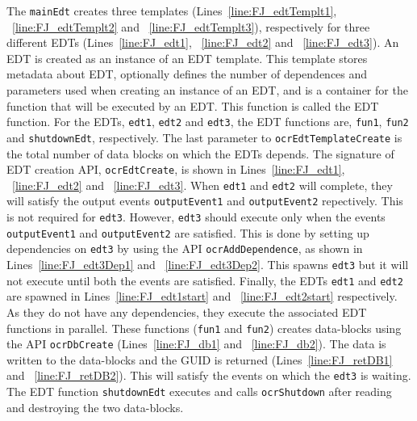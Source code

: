 The \texttt{mainEdt} creates three templates (Lines~\ref{line:FJ_edtTemplt1}, ~\ref{line:FJ_edtTemplt2}
and ~\ref{line:FJ_edtTemplt3}), respectively for three different EDTs
(Lines~\ref{line:FJ_edt1}, ~\ref{line:FJ_edt2} and ~\ref{line:FJ_edt3}).
An EDT is created as an instance of an EDT template.
This template stores metadata about EDT,
optionally defines the number of dependences and parameters used when
creating an instance of an EDT, and is a container for the function
that will be executed by an EDT. This function is called the EDT function.
For the EDTs, \texttt{edt1}, \texttt{edt2} and \texttt{edt3}, the EDT functions
are, \texttt{fun1}, \texttt{fun2} and \texttt{shutdownEdt}, respectively.
The last parameter to \texttt{ocrEdtTemplateCreate} is the total number of
data blocks on which the EDTs depends. The signature of EDT creation API,
\texttt{ocrEdtCreate}, is shown in Lines~\ref{line:FJ_edt1}, ~\ref{line:FJ_edt2}
and ~\ref{line:FJ_edt3}. When \texttt{edt1} and \texttt{edt2} will complete,
they will satisfy the output events \texttt{outputEvent1} and \texttt{outputEvent2} repectively.
This is not required for \texttt{edt3}. However, \texttt{edt3} should execute only
when the events \texttt{outputEvent1} and \texttt{outputEvent2} are satisfied.
This is done by setting up dependencies on \texttt{edt3} by using the API \texttt{ocrAddDependence},
as shown in Lines~\ref{line:FJ_edt3Dep1} and ~\ref{line:FJ_edt3Dep2}.
This spawns \texttt{edt3} but it will not execute until both the events
are satisfied. Finally, the EDTs \texttt{edt1} and \texttt{edt2} are
spawned in Lines~\ref{line:FJ_edt1start} and ~\ref{line:FJ_edt2start} respectively.
As they do not have any dependencies, they execute the associated EDT functions
in parallel. These functions (\texttt{fun1} and \texttt{fun2}) creates
data-blocks using the API \texttt{ocrDbCreate} (Lines~\ref{line:FJ_db1} and ~\ref{line:FJ_db2}).
The data is written to the data-blocks and the GUID is returned (Lines~\ref{line:FJ_retDB1}
and ~\ref{line:FJ_retDB2}). This will satisfy the events on which the \texttt{edt3}
is waiting. The EDT function \texttt{shutdownEdt} executes
and calls \texttt{ocrShutdown} after reading and destroying the two data-blocks.

